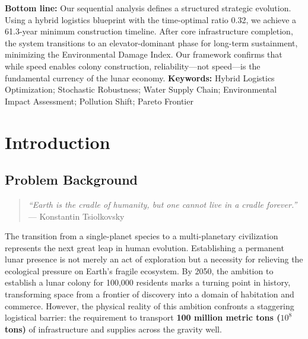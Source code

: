 \documentclass[11pt,letterpaper]{article}
\begin{document}
\textbf{Bottom line:} Our sequential analysis defines a structured strategic evolution. Using a hybrid logistics blueprint with the time-optimal ratio 0.32, we achieve a 61.3-year minimum construction timeline. After core infrastructure completion, the system transitions to an elevator-dominant phase for long-term sustainment, minimizing the Environmental Damage Index. Our framework confirms that while speed enables colony construction, reliability—not speed—is the fundamental currency of the lunar economy.
\vfill
\noindent\textbf{Keywords:} Hybrid Logistics Optimization; Stochastic Robustness; Water Supply Chain; Environmental Impact Assessment; Pollution Shift; Pareto Frontier


\restoregeometry %
\tableofcontents
\thispagestyle{empty} %
\newpage
\setcounter{page}{1} %


\section{Introduction}

\subsection{Problem Background}

\begin{quote}
\textit{``Earth is the cradle of humanity, but one cannot live in a cradle forever.''}
\hfill --- Konstantin Tsiolkovsky
\end{quote}

The transition from a single-planet species to a multi-planetary civilization represents the next great leap in human evolution. Establishing a permanent lunar presence is not merely an act of exploration but a necessity for relieving the ecological pressure on Earth’s fragile ecosystem. By 2050, the ambition to establish a lunar colony for 100,000 residents marks a turning point in history, transforming space from a frontier of discovery into a domain of habitation and commerce. However, the physical reality of this ambition confronts a staggering logistical barrier: the requirement to transport \textbf{100 million metric tons ($10^8$ tons)} of infrastructure and supplies across the gravity well.
\end{document}
